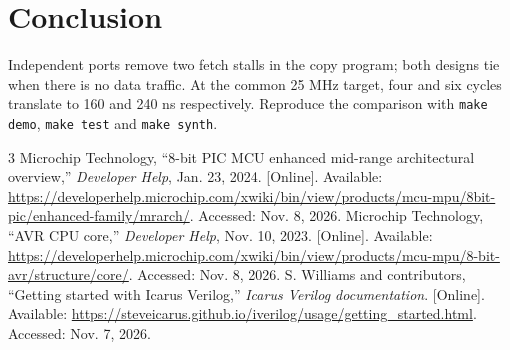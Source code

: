 \documentclass[conference,a4paper]{IEEEtran}
\begin{document}
\section{Conclusion}
Independent ports remove two fetch stalls in the copy program; both
designs tie when there is no data traffic. At the common 25 MHz target,
four and six cycles translate to 160 and 240 ns respectively.
Reproduce the comparison with \texttt{make demo}, \texttt{make test}
and \texttt{make synth}.

\begin{thebibliography}{3}
 Microchip Technology, ``8-bit PIC MCU enhanced mid-range
architectural overview,'' \textit{Developer Help}, Jan. 23, 2024.
[Online]. Available:
\url{https://developerhelp.microchip.com/xwiki/bin/view/products/mcu-mpu/8bit-pic/enhanced-family/mrarch/}.
Accessed: Nov. 8, 2026.
 Microchip Technology, ``AVR CPU core,'' \textit{Developer
Help}, Nov. 10, 2023. [Online]. Available:
\url{https://developerhelp.microchip.com/xwiki/bin/view/products/mcu-mpu/8-bit-avr/structure/core/}.
Accessed: Nov. 8, 2026.
 S. Williams and contributors, ``Getting started with
Icarus Verilog,'' \textit{Icarus Verilog documentation}. [Online]. Available:
\url{https://steveicarus.github.io/iverilog/usage/getting_started.html}.
Accessed: Nov. 7, 2026.
\end{thebibliography}
\end{document}
